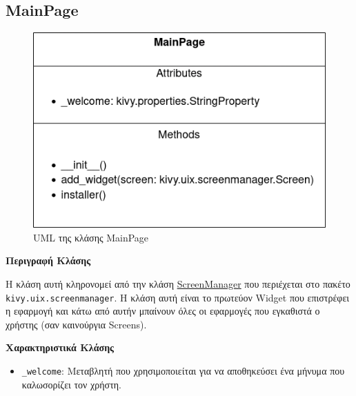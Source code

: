 \newpage
\subsection{MainPage}

\begin{figure}[h]
    \centering
    \includegraphics[scale=0.7]{images/chapter4/uml_diagrams/MainPage.png}
    \caption{UML της κλάσης MainPage}
    \label{fig:mainpage}
\end{figure}

\noindent\textbf{Περιγραφή Κλάσης}

Η κλάση αυτή κληρονομεί από την κλάση \href{https://kivy.org/doc/stable/api-kivy.uix.screenmanager.html\#kivy.uix.screenmanager.ScreenManager}{ScreenManager} που περιέχεται στο πακέτο \texttt{kivy.uix.screenmanager}. Η κλάση αυτή είναι το πρωτεύον Widget που επιστρέφει η εφαρμογή και κάτω από αυτήν μπαίνουν όλες οι εφαρμογές που εγκαθιστά ο χρήστης (σαν καινούργια Screens).

\noindent\textbf{Χαρακτηριστικά Κλάσης}
\begin{itemize}
    \item \texttt{\_welcome}: Μεταβλητή που χρησιμοποιείται για να αποθηκεύσει ένα μήνυμα που καλωσορίζει τον χρήστη.
\end{itemize}

